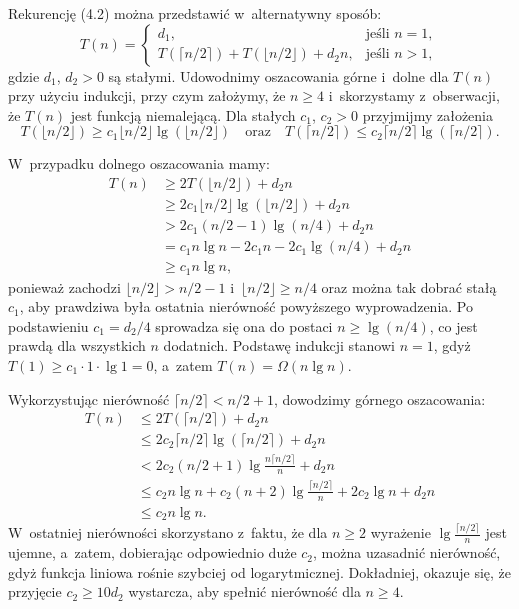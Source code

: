 \exercise %
Rekurencję (4.2) można przedstawić w~alternatywny sposób:
\[
	T(n) =
	\begin{cases}
		d_1, & \text{jeśli $n=1$}, \\
		T(\lceil n/2\rceil)+T(\lfloor n/2\rfloor)+d_2n, & \text{jeśli $n>1$},
	\end{cases}
\]
gdzie $d_1$, $d_2>0$ są stałymi.
Udowodnimy oszacowania górne i~dolne dla $T(n)$ przy użyciu indukcji, przy czym założymy, że $n\ge4$ i~skorzystamy z~obserwacji, że $T(n)$ jest funkcją niemalejącą.
Dla stałych $c_1$, $c_2>0$ przyjmijmy założenia
\[
	T(\lfloor n/2\rfloor) \ge c_1\lfloor n/2\rfloor\lg(\lfloor n/2\rfloor) \quad\text{oraz}\quad T(\lceil n/2\rceil) \le c_2\lceil n/2\rceil\lg(\lceil n/2\rceil).
\]

W~przypadku dolnego oszacowania mamy:
\begin{align*}
	T(n) &\ge 2T(\lfloor n/2\rfloor)+d_2n \\
	&\ge 2c_1\lfloor n/2\rfloor\lg(\lfloor n/2\rfloor)+d_2n \\
	&> 2c_1(n/2-1)\lg(n/4)+d_2n \\
	&= c_1n\lg n-2c_1n-2c_1\!\lg(n/4)+d_2n \\
	&\ge c_1n\lg n,
\end{align*}
ponieważ zachodzi $\lfloor n/2\rfloor>n/2-1$ i~$\lfloor n/2\rfloor\ge n/4$ oraz można tak dobrać stałą $c_1$, aby prawdziwa była ostatnia nierówność powyższego wyprowadzenia.
Po podstawieniu $c_1=d_2/4$ sprowadza się ona do postaci $n\ge\lg(n/4)$, co jest prawdą dla wszystkich $n$ dodatnich.
Podstawę indukcji stanowi $n=1$, gdyż $T(1)\ge c_1\cdot 1\cdot\lg1=0$, a~zatem $T(n)=\Omega(n\lg n)$.

Wykorzystując nierówność $\lceil n/2\rceil<n/2+1$, dowodzimy górnego oszacowania:
\begin{align*}
	T(n) &\le 2T(\lceil n/2\rceil)+d_2n \\
	&\le 2c_2\lceil n/2\rceil\lg(\lceil n/2\rceil)+d_2n \\
	&< 2c_2(n/2+1)\lg\frac{n\lceil n/2\rceil}{n}+d_2n \\
	&\le c_2n\lg n+c_2(n+2)\lg\frac{\lceil n/2\rceil}{n}+2c_2\lg n+d_2n \\
	&\le c_2n\lg n.
\end{align*}
W~ostatniej nierówności skorzystano z~faktu, że dla $n\ge2$ wyrażenie $\lg\frac{\lceil n/2\rceil}{n}$ jest ujemne, a~zatem, dobierając odpowiednio duże $c_2$, można uzasadnić nierówność, gdyż funkcja liniowa rośnie szybciej od logarytmicznej.
Dokładniej, okazuje się, że przyjęcie $c_2\ge10d_2$ wystarcza, aby spełnić nierówność dla $n\ge4$.

